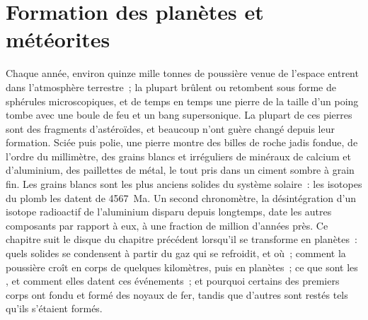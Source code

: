 \chapter{Formation des planètes et météorites}\label{ch:b2:planet-formation-meteorites}

Chaque année, environ quinze mille tonnes de poussière venue de l'espace entrent dans
l'atmosphère terrestre~; la plupart brûlent ou retombent sous forme de sphérules
microscopiques, et de temps en temps une pierre de la taille d'un poing tombe avec une boule
de feu et un bang supersonique. La plupart de ces pierres sont des fragments d'astéroïdes, et
beaucoup n'ont guère changé depuis leur formation. Sciée puis polie, une pierre montre des
billes de roche jadis fondue, de l'ordre du millimètre, des grains blancs et irréguliers de
minéraux de calcium et d'aluminium, des paillettes de métal, le tout pris dans un ciment
sombre à grain fin. Les grains blancs sont les plus anciens solides du système solaire~: les
isotopes du plomb les datent de 4567~Ma. Un second chronomètre, la désintégration d'un
isotope radioactif de l'aluminium disparu depuis longtemps, date les autres composants par
rapport à eux, à une fraction de million d'années près. Ce chapitre suit le disque du
chapitre précédent lorsqu'il se transforme en planètes~: quels solides se condensent à partir
du gaz qui se refroidit, et où~; comment la poussière croît en corps de quelques kilomètres,
puis en planètes~; ce que sont les , et comment elles datent ces événements~; et
pourquoi certains des premiers corps ont fondu et formé des noyaux de fer, tandis que
d'autres sont restés tels qu'ils s'étaient formés.

